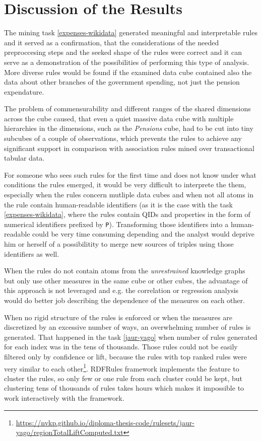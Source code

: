 \chapter{Discussion of the Results\label{discussion}}

The mining task \ref{expenses-wikidata} generated meaningful and interpretable rules and it served as a confirmation, that the considerations of the needed preproccesing steps and the seeked shape of the rules were correct and it can serve as a demonstration of the possibilities of performing this type of analysis. More diverse rules would be found if the examined data cube contained also the data about other branches of the government spending, not just the pension expendature.

The problem of commensurability and different ranges of the shared dimensions across the cube caused, that even a quiet massive data cube with multiple hierarchies in the dimensions, such as the \textit{Pensions} cube, had to be cut into tiny subcubes of a couple of observations, which prevents the rules to achieve any significant support in comparison with association rules mined over transactional tabular data.

For someone who sees such rules for the first time and does not know under what conditions the rules emerged, it would be very difficult to interprete the them, especially when the rules concern mutliple data cubes and when not all atoms in the rule contain human-readable identifiers (as it is the case with the task \ref{expenses-wikidata}, where the rules contain QIDs and properties in the form of numerical identifiers prefixed by \verb|P|). Transforming those identifiers into a human-readable could be very time consuming depending and the analyst would deprive him or herself of a possibilitity to merge new sources of triples using those identifiers as well. 

When the rules do not contain atoms from the \textit{unrestrained} knowledge graphs but only use other measures in the same cube or other cubes, the advantage of this approach is not leveraged and e.g. the correlation or regression analysis would do better job describing the dependence of the measures on each other. 

When no rigid structure of the rules is enforced or when the measures are discretized by an excessive number of ways, an overwhelming number of rules is generated. That happened in the task \ref{jaur-yago} when number of rules generated for each index was in the tens of thousands. Those rules could not be easily filtered only by confidence or lift, because the rules with top ranked rules were very similar to each other\footnote{\href{https://nvkp.github.io/diploma-thesis-code/rulesets/jaur-yago/regionTotalLiftComputed.txt}{https://nvkp.github.io/diploma-thesis-code/rulesets/jaur-yago/regionTotalLiftComputed.txt}}. RDFRules framework implements the feature to cluster the rules, so only few or one rule from each cluster could be kept, but clustering tens of thousands of rules takes hours which makes it impossible to work interactively with the framework. 

